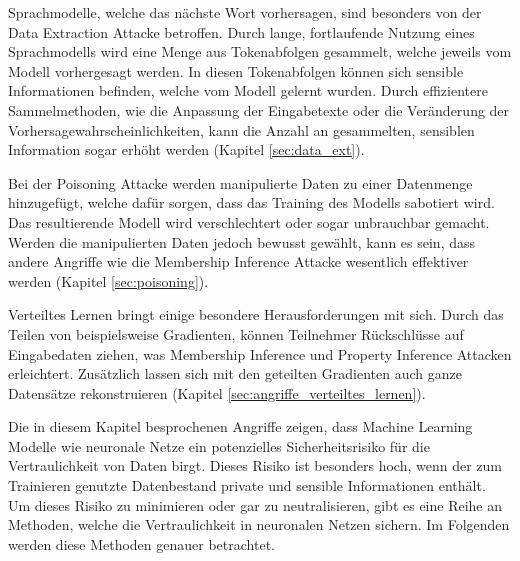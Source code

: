 Sprachmodelle, welche das nächste Wort vorhersagen, sind besonders von der Data Extraction Attacke betroffen.
Durch lange, fortlaufende Nutzung eines Sprachmodells wird eine Menge aus Tokenabfolgen gesammelt, welche jeweils vom Modell vorhergesagt werden.
In diesen Tokenabfolgen können sich sensible Informationen befinden, welche vom Modell gelernt wurden.
Durch effizientere Sammelmethoden, wie die Anpassung der Eingabetexte oder die Veränderung der Vorhersagewahrscheinlichkeiten, kann die Anzahl an gesammelten, sensiblen Information sogar erhöht werden (Kapitel \ref{sec:data_ext}).

Bei der Poisoning Attacke werden manipulierte Daten zu einer Datenmenge hinzugefügt, welche dafür sorgen, dass das Training des Modells sabotiert wird.
Das resultierende Modell wird verschlechtert oder sogar unbrauchbar gemacht.
Werden die manipulierten Daten jedoch bewusst gewählt, kann es sein, dass andere Angriffe wie die Membership Inference Attacke wesentlich effektiver werden (Kapitel \ref{sec:poisoning}).

Verteiltes Lernen bringt einige besondere Herausforderungen mit sich.
Durch das Teilen von beispielsweise Gradienten, können Teilnehmer Rückschlüsse auf Eingabedaten ziehen, was Membership Inference und Property Inference Attacken erleichtert.
Zusätzlich lassen sich mit den geteilten Gradienten auch ganze Datensätze rekonstruieren (Kapitel \ref{sec:angriffe_verteiltes_lernen}).

Die in diesem Kapitel besprochenen Angriffe zeigen, dass Machine Learning Modelle wie neuronale Netze ein potenzielles Sicherheitsrisiko für die Vertraulichkeit von Daten birgt.
Dieses Risiko ist besonders hoch, wenn der zum Trainieren genutzte Datenbestand private und sensible Informationen enthält.
Um dieses Risiko zu minimieren oder gar zu neutralisieren, gibt es eine Reihe an Methoden, welche die Vertraulichkeit in neuronalen Netzen sichern.
Im Folgenden werden diese Methoden genauer betrachtet.